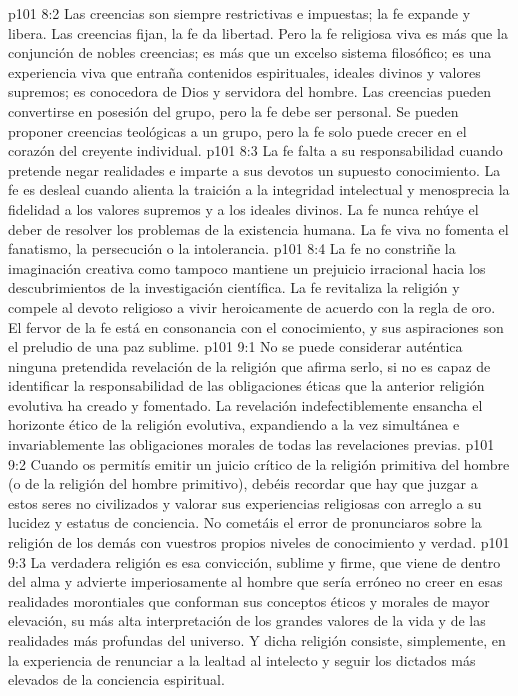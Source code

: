 \vs p101 8:2 Las creencias son siempre restrictivas e impuestas; la fe expande y libera. Las creencias fijan, la fe da libertad. Pero la fe religiosa viva es más que la conjunción de nobles creencias; es más que un excelso sistema filosófico; es una experiencia viva que entraña contenidos espirituales, ideales divinos y valores supremos; es conocedora de Dios y servidora del hombre. Las creencias pueden convertirse en posesión del grupo, pero la fe debe ser personal. Se pueden proponer creencias teológicas a un grupo, pero la fe solo puede crecer en el corazón del creyente individual.
\vs p101 8:3 La fe falta a su responsabilidad cuando pretende negar realidades e imparte a sus devotos un supuesto conocimiento. La fe es desleal cuando alienta la traición a la integridad intelectual y menosprecia la fidelidad a los valores supremos y a los ideales divinos. La fe nunca rehúye el deber de resolver los problemas de la existencia humana. La fe viva no fomenta el fanatismo, la persecución o la intolerancia.
\vs p101 8:4 La fe no constriñe la imaginación creativa como tampoco mantiene un prejuicio irracional hacia los descubrimientos de la investigación científica. La fe revitaliza la religión y compele al devoto religioso a vivir heroicamente de acuerdo con la regla de oro. El fervor de la fe está en consonancia con el conocimiento, y sus aspiraciones son el preludio de una paz sublime.
\vs p101 9:1 No se puede considerar auténtica ninguna pretendida revelación de la religión que afirma serlo, si no es capaz de identificar la responsabilidad de las obligaciones éticas que la anterior religión evolutiva ha creado y fomentado. La revelación indefectiblemente ensancha el horizonte ético de la religión evolutiva, expandiendo a la vez simultánea e invariablemente las obligaciones morales de todas las revelaciones previas.
\vs p101 9:2 Cuando os permitís emitir un juicio crítico de la religión primitiva del hombre (o de la religión del hombre primitivo), debéis recordar que hay que juzgar a estos seres no civilizados y valorar sus experiencias religiosas con arreglo a su lucidez y estatus de conciencia. No cometáis el error de pronunciaros sobre la religión de los demás con vuestros propios niveles de conocimiento y verdad.
\vs p101 9:3 La verdadera religión es esa convicción, sublime y firme, que viene de dentro del alma y advierte imperiosamente al hombre que sería erróneo no creer en esas realidades morontiales que conforman sus conceptos éticos y morales de mayor elevación, su más alta interpretación de los grandes valores de la vida y de las realidades más profundas del universo. Y dicha religión consiste, simplemente, en la experiencia de renunciar a la lealtad al intelecto y seguir los dictados más elevados de la conciencia espiritual.

